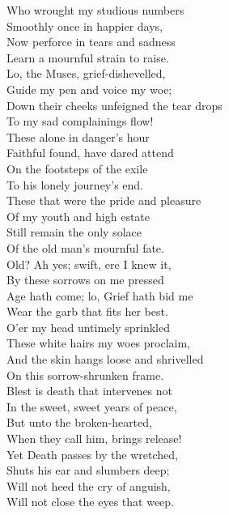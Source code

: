 \documentclass[12pt]{book}
\newenvironment{ipoem}[1]%
  {\setcounter{poemindentevery}{#1}\begin{poem}\small}%
  {\end{poem}\setcounter{poemindentevery}{0}}
\begin{document}
\begin{ipoem}{2}
    Who wrought my studious numbers \\
      Smoothly once in happier days, \\
    Now perforce in tears and sadness \\
      Learn a mournful strain to raise. \\
    Lo, the Muses, grief-dishevelled, \\
      Guide my pen and voice my woe; \\
    Down their cheeks unfeigned the tear drops \\
      To my sad complainings flow! \\
    These alone in danger's hour \\
      Faithful found, have dared attend \\
    On the footsteps of the exile \\
      To his lonely journey's end. \\
    These that were the pride and pleasure \\
      Of my youth and high estate \\
    Still remain the only solace \\
      Of the old man's mournful fate. \\
    Old? Ah yes; swift, ere I knew it, \\
      By these sorrows on me pressed \\
    Age hath come; lo, Grief hath bid me \\
      Wear the garb that fits her best. \\
    O'er my head untimely sprinkled \\
      These white hairs my woes proclaim, \\
    And the skin hangs loose and shrivelled \\
      On this sorrow-shrunken frame. \\
    Blest is death that intervenes not \\
      In the sweet, sweet years of peace, \\
    But unto the broken-hearted, \\
      When they call him, brings release! \\
    Yet Death passes by the wretched, \\
      Shuts his ear and slumbers deep; \\
    Will not heed the cry of anguish, \\
      Will not close the eyes that weep. \\

\end{ipoem}
\end{document}
